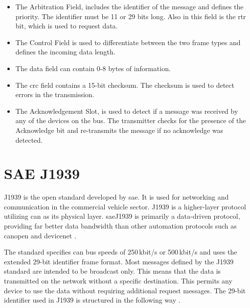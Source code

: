 \begin{itemize}
		\item The Arbitration Field, includes the identifier of the message and defines the priority. The identifier must be 11 or 29 bits long. Also in this field is the \acrfull{rtr} bit, which is used to request data.
		\item The Control Field is used to differentiate between the two frame types and defines the incoming data length.
		\item The data field can contain 0-8 bytes of information.
		\item The \acrshort{crc} field contains a 15-bit checksum. The checksum is used to detect errors in the transmission.
		\item The Acknowledgement Slot, is used to detect if a message was received by any of the devices on the bus. The transmitter checks for the presence of the Acknowledge bit and re-transmits the message if no acknowledge was detected.
\end{itemize}
\newpage

\section{SAE J1939}
J1939 is the open standard developed by \acrfull{sae}. It is used for networking and communication in the commercial vehicle sector. J1939 is a higher-layer protocol utilizing \acrshort{can} as its physical layer. \acrshort{sae}\;J1939 is primarily a data-driven protocol, providing far better data bandwidth than other automation protocols such as \gls{canopen} and \gls{devicenet} \cite{introduction_sae_j1939_protocol}.

The standard specifies \acrshort{can} bus speeds of 250\,kbit/s or 500\,kbit/s and uses the extended 29-bit identifier frame format. Most messages defined by the J1939 standard are intended to be broadcast only. This means that the data is transmitted on the network without a specific destination. This permits any device to use the data without requiring additional request messages. The 29-bit identifier used in J1939 is structured in the following way \cite{sae_j1939_introduction}. 

